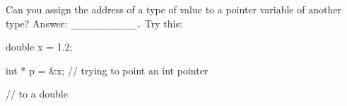 Can you assign the address of a type of value to a pointer variable of another type? Answer: \verb!_____________.! Try this:



\begin{consolethree}[escapeinside=||]

double x = 1.2;

int * p = &x; // trying to point an int pointer

              // to a double

\end{consolethree}

